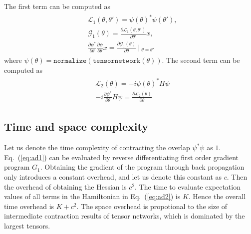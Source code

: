 \documentclass{article}
\theoremstyle{definition}
\newcommand{\Eq}[1]{Eq.~(\ref{#1})}
\newcommand{\pdv}[2]{{\frac{\partial#1}{\partial#2}}}
\newcommand\given[1][]{\:#1\vert\:}
\begin{document}
The first term can be computed as
\begin{align}
    \begin{split}
        &\mathcal{L}_1(\theta, \theta') = \psi(\theta)^*\psi(\theta'),\\
        &\mathcal{G}_1(\theta) = \pdv{\mathcal{L}_1(\theta, \theta')}{\theta'}x,\\
        &\pdv{\psi^*}{\theta}\pdv{\psi}{\theta}x = \pdv{\mathcal{G}_1(\theta)}{\theta} \given[\Big]_{\theta =\theta'}
    \end{split}\label{eq:ad1}
\end{align}
where $\psi(\theta) = \texttt{normalize}(\texttt{tensornetwork}(\theta))$.
The second term can be computed as
\begin{align}
    \begin{split}
        &\mathcal{L}_2(\theta) = -i\psi(\theta)^*H\psi\\
        &-i\pdv{\psi^*}{\theta}H\psi = \pdv{\mathcal{L}_2(\theta)}{\theta}
    \end{split}\label{eq:ad2}
\end{align}

\subsection{Time and space complexity}
Let us denote the time complexity of contracting the overlap $\psi^*\psi$ as $1$.
\Eq{eq:ad1} can be evaluated by reverse differentiating first order gradient program $G_1$.
Obtaining the gradient of the program through back propagation only introduces a constant overhead, and let us denote this constant as $c$. Then the overhead of obtaining the Hessian is $c^2$.
The time to evaluate expectation values of all terms in the Hamiltonian in \Eq{eq:ad2} is $K$.
Hence the overall time overhead is $K+c^2$. The space overhead is propotional to the size of intermediate contraction results of tensor networks, which is dominated by the largest tensors.



\end{document}
